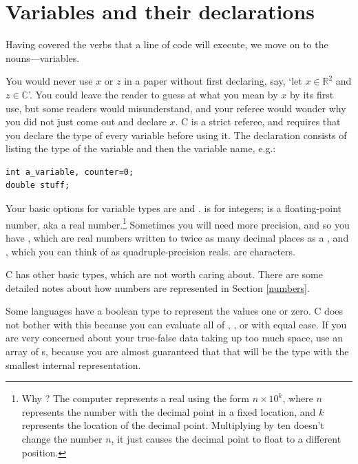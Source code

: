 \section{Variables and their declarations} \label{declaring}

Having covered the verbs that a line of code will execute, we move on
to the nouns---variables. 

You would never use $x$ or $z$ in a paper without first declaring,
say, `let $x \in {\mathbb R}^2$ and $z \in {\mathbb C}$'. You could
leave the reader to guess at what you mean by $x$ by its first use,
but some readers would misunderstand, and your referee would wonder why
you did not just come out and declare $x$. C is a strict referee, and
requires that you declare the type of every variable before using it.
The declaration consists of listing the type of the variable and then
the variable name, e.g.:

\begin{lstlisting}
int a_variable, counter=0;
double stuff;
\end{lstlisting}


Your basic options for variable types are  
and .  is for integers;
 is a floating-point number, aka a real number.\footnote{Why ? The
computer represents a real using the form $n \times 10^k$, where $n$
represents the number with the decimal point in a fixed location,
and $k$ represents the location of the decimal point.  Multiplying by
ten doesn't change the number $n$, it just causes the decimal point to
float to a different position.} Sometimes you will need more precision,
and so you have , which are real numbers written to twice
as many decimal places as a ,
and , which you can think of as quadruple-precision
reals.  are characters.	

C has other basic types, which are not worth caring about. There
are some detailed notes about how numbers are represented in Section
\ref{numbers}.

Some languages have a boolean type to represent the values one or zero.
C does not bother with this because you can
evaluate all of , , or 
with equal ease. If you are very concerned about 
your true-false data taking up too much space, use an array of s,
because you are almost guaranteed that that will be the type with the
smallest internal representation.

